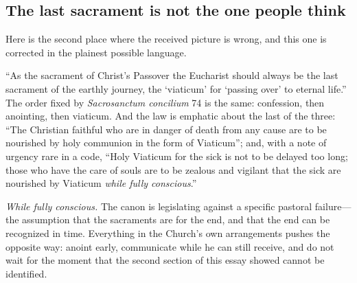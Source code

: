 \subsection{The last sacrament is not the one people think}

Here is the second place where the received picture is wrong, and this one is corrected in the plainest possible language.

``As the sacrament of Christ's Passover the Eucharist should always be the last sacrament of the earthly journey, the `viaticum' for `passing over' to eternal life.'' The order fixed by \emph{Sacrosanctum concilium} 74 is the same: confession, then anointing, then viaticum. And the law is emphatic about the last of the three: ``The Christian faithful who are in danger of death from any cause are to be nourished by holy communion in the form of Viaticum''; and, with a note of urgency rare in a code, ``Holy Viaticum for the sick is not to be delayed too long; those who have the care of souls are to be zealous and vigilant that the sick are nourished by Viaticum \emph{while fully conscious}.''

\emph{While fully conscious.} The canon is legislating against a specific pastoral failure---the assumption that the sacraments are for the end, and that the end can be recognized in time. Everything in the Church's own arrangements pushes the opposite way: anoint early, communicate while he can still receive, and do not wait for the moment that the second section of this essay showed cannot be identified.

